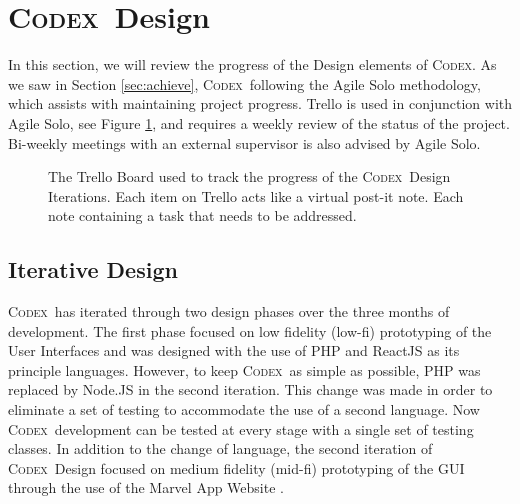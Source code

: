 \documentclass[progress]{cmpreport}
\newcommand{\Codex}{\textsc{Codex}}
\begin{document}
	\section{\Codex \ Design} \label{sec:design}
	In this section, we will review the progress of the Design elements of \Codex. As we saw in Section \ref{sec:achieve}, \Codex \ following the Agile Solo methodology, which assists with maintaining project progress. Trello is used in conjunction with Agile Solo, see Figure \ref{fig:trello-board}, and requires a weekly review of the status of the project. Bi-weekly meetings with an external supervisor is also advised by Agile Solo.  
	
	\begin{figure}[h]
		\centering
		\caption{The Trello Board used to track the progress of the \Codex \ Design Iterations. Each item on Trello acts like a virtual post-it note. Each note containing a task that needs to be addressed.} \label{fig:trello-board}
	\end{figure}
	
		\subsection{Iterative Design}
		\Codex \ has iterated through two design phases over the three months of development. The first phase focused on low fidelity (low-fi) prototyping of the User Interfaces and was designed with the use of PHP and ReactJS as its principle languages. However, to keep \Codex \ as simple as possible, PHP was replaced by Node.JS in the second iteration. This change was made in order to eliminate a set of testing to accommodate the use of a second language. Now \Codex \ development can be tested at every stage with a single set of testing classes. In addition to the change of language, the second iteration of \Codex \ Design focused on medium fidelity (mid-fi) prototyping of the GUI through the use of the Marvel App Website \citep{marvelapp}.
	
\end{document}
